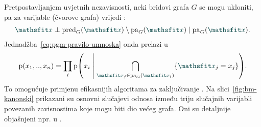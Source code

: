 \documentclass[utf8, diplomski, lmodern]{fer}
\begin{document}
Pretpostavljanjem uvjetnih nezavisnosti, neki bridovi grafa $G$ se mogu ukloniti, pa za varijable (čvorove grafa) vrijedi :
\begin{align}
\rvar x\perp \pred_G(\rvar x) \setminus \pa_G(\rvar x) \mid \pa_G(\rvar x) \text{.}
\end{align}
Jednadžba~\eqref{eq:pgm-pravilo-umnoska} onda prelazi u 
\begin{align}
\p(x_1,..,x_n) 
= \prod_i\p\del{x_i \midmid \bigcap_{\rvar x_j\in\pa_G(\rvar x_i)}\cbr{\rvar x_j=x_j}} \text{.}
\end{align} 
To omogućuje primjenu efikasnijih algoritama za zaključivanje \citep{Murphy:2012:MLPP}.
Na slici~\ref{fig:bm-kanonski} prikazani su osnovni slučajevi odnosa između triju slučajnih varijabli povezanih zavisnostima koje mogu biti dio većeg grafa. Oni su detaljnije objašnjeni npr. u \citet{Bishop:2006:PRML,Alpaydin:2014:IML}. 
\end{document}
